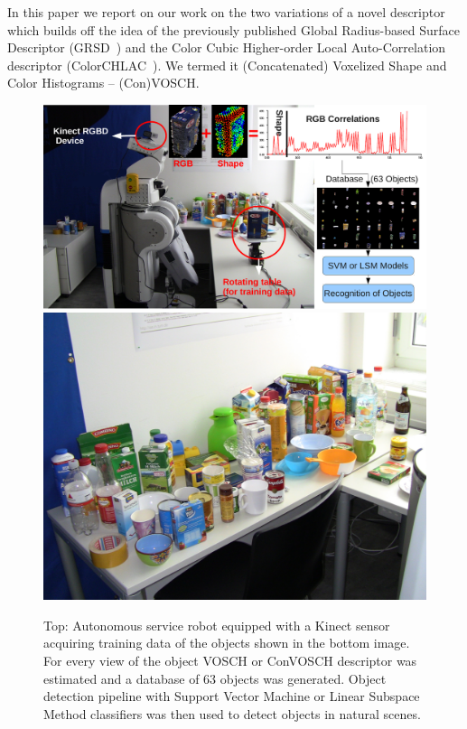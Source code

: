 \documentclass[conference]{sty/IEEEtran}
\begin{document}
In this paper we report on our work on the two variations of a novel descriptor
which builds off the idea of the previously 
published Global Radius-based Surface Descriptor (GRSD~\cite{GRSD10Humanoids}) and the
Color Cubic Higher-order Local Auto-Correlation descriptor (ColorCHLAC~\cite{kanezaki2010tvc}).
We termed it (Concatenated) Voxelized Shape and Color Histograms -- (Con)VOSCH.

\begin{figure}[htb!]
  \begin{center}
    \includegraphics[width=.99\columnwidth]{figures/firstpage/firstpage.pdf}
    \includegraphics[width=.99\columnwidth]{figures/objects/objects.jpg}
    \caption{Top: Autonomous service robot equipped with a Kinect sensor
    acquiring training data of the objects shown in the bottom image. For 
  every view of the object VOSCH or ConVOSCH descriptor was estimated and a database
of 63 objects was generated. Object detection pipeline with Support Vector
Machine or Linear Subspace Method classifiers was then used to detect objects
in natural scenes.}
    \label{fig:robot}
  \end{center}
\end{figure}
\end{document}
